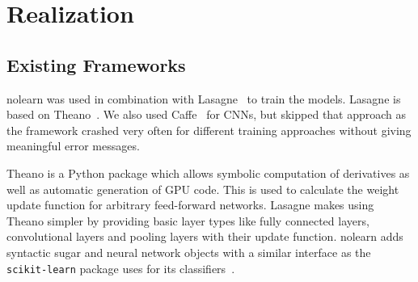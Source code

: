 
\section{Realization}\label{sec:realization}
\subsection{Existing Frameworks}\label{sec:frameworks}
nolearn was used in combination with Lasagne~\cite{sander_dieleman_2015_27878}
to train the models. Lasagne is based on Theano~\cite{Bergstra2010}. We also
used Caffe~\cite{Jia2014} for \glspl{CNN}, but skipped that approach as the
framework crashed very often for different training approaches without giving
meaningful error messages.

Theano is a Python package which allows symbolic computation of derivatives as
well as automatic generation of GPU code. This is used to calculate the weight
update function for arbitrary feed-forward networks. Lasagne makes using Theano
simpler by providing basic layer types like fully connected layers,
convolutional layers and pooling layers with their update function. nolearn
adds syntactic sugar and neural network objects with a similar interface
as the \verb+scikit-learn+ package uses for its classifiers~\cite{scikit-learn}.

